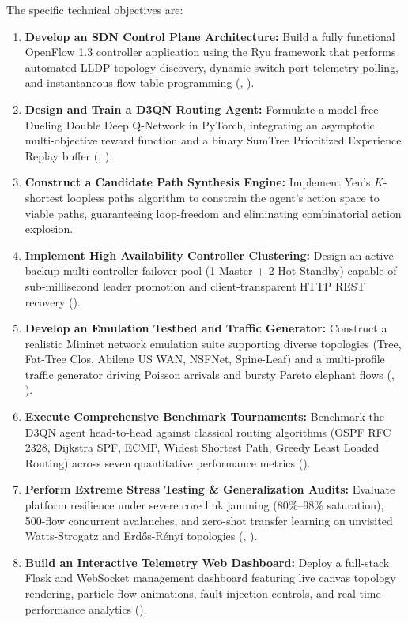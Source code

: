\documentclass[12pt,a4paper,oneside]{report}
\begin{document}
The specific technical objectives are:
\begin{enumerate}
    \item \textbf{Develop an SDN Control Plane Architecture:} Build a fully functional OpenFlow 1.3 controller application using the Ryu framework that performs automated LLDP topology discovery, dynamic switch port telemetry polling, and instantaneous flow-table programming (, ).
    \item \textbf{Design and Train a D3QN Routing Agent:} Formulate a model-free Dueling Double Deep Q-Network in PyTorch, integrating an asymptotic multi-objective reward function and a binary SumTree Prioritized Experience Replay buffer (, ).
    \item \textbf{Construct a Candidate Path Synthesis Engine:} Implement Yen's $K$-shortest loopless paths algorithm to constrain the agent's action space to viable paths, guaranteeing loop-freedom and eliminating combinatorial action explosion.
    \item \textbf{Implement High Availability Controller Clustering:} Design an active-backup multi-controller failover pool (1 Master + 2 Hot-Standby) capable of sub-millisecond leader promotion and client-transparent HTTP REST recovery ().
    \item \textbf{Develop an Emulation Testbed and Traffic Generator:} Construct a realistic Mininet network emulation suite supporting diverse topologies (Tree, Fat-Tree Clos, Abilene US WAN, NSFNet, Spine-Leaf) and a multi-profile traffic generator driving Poisson arrivals and bursty Pareto elephant flows (, ).
    \item \textbf{Execute Comprehensive Benchmark Tournaments:} Benchmark the D3QN agent head-to-head against classical routing algorithms (OSPF RFC 2328, Dijkstra SPF, ECMP, Widest Shortest Path, Greedy Least Loaded Routing) across seven quantitative performance metrics ().
    \item \textbf{Perform Extreme Stress Testing \& Generalization Audits:} Evaluate platform resilience under severe core link jamming (80\%--98\% saturation), 500-flow concurrent avalanches, and zero-shot transfer learning on unvisited Watts-Strogatz and Erd\H{o}s-R\'{e}nyi topologies (, ).
    \item \textbf{Build an Interactive Telemetry Web Dashboard:} Deploy a full-stack Flask and WebSocket management dashboard featuring live canvas topology rendering, particle flow animations, fault injection controls, and real-time performance analytics ().
\end{enumerate}
\end{document}
